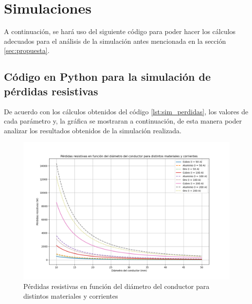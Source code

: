 \section{Simulaciones}
    
    A continuación, se hará uso del siguiente código para poder hacer los cálculos adecuados para el análisis de la simulación antes mencionada en la sección \ref{sec:propuesta}. 

    \subsection{Código en Python para la simulación de pérdidas resistivas}

    

    De acuerdo con los cálculos obtenidos del código \ref{lst:sim_perdidas}, los valores de cada parámetro y, la gráfica se mostraran a continuación, de esta manera poder analizar los resultados obtenidos de la simulación realizada.

        \begin{figure}[H]
            \centering
            \setcounter{figure}{0}
            \renewcommand{\figurename}{Gráfica}
            \includegraphics[width=\textwidth]{imagenes/perdidas_resistivas.png}
            \caption{Pérdidas resistivas en función del diámetro del conductor para distintos materiales y corrientes}
            \label{fig:Perdidas_resistivas}
        \end{figure}

